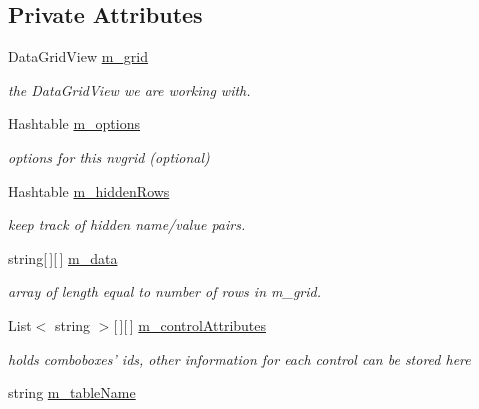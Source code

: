 \subsection*{Private Attributes}
\begin{DoxyCompactItemize}
\item 
DataGridView \hyperlink{class_ias_pbx_config_1_1_name_value_grid_a588270d544b904d41de5081329739d3d}{m\_\-grid}
\begin{DoxyCompactList}\small\item\em the DataGridView we are working with. \item\end{DoxyCompactList}\item 
Hashtable \hyperlink{class_ias_pbx_config_1_1_name_value_grid_a536cacb74f82c03d40dee9f8cf4b0da5}{m\_\-options}
\begin{DoxyCompactList}\small\item\em options for this nvgrid (optional) \item\end{DoxyCompactList}\item 
Hashtable \hyperlink{class_ias_pbx_config_1_1_name_value_grid_aba9a53f0a732686cb3ba46dce7171a75}{m\_\-hiddenRows}
\begin{DoxyCompactList}\small\item\em keep track of hidden name/value pairs. \item\end{DoxyCompactList}\item 
string\mbox{[}$\,$\mbox{]}\mbox{[}$\,$\mbox{]} \hyperlink{class_ias_pbx_config_1_1_name_value_grid_a816a0c9ece3edb83afb39863e1f843b4}{m\_\-data}
\begin{DoxyCompactList}\small\item\em array of length equal to number of rows in m\_\-grid. \item\end{DoxyCompactList}\item 
List$<$ string $>$\mbox{[}$\,$\mbox{]}\mbox{[}$\,$\mbox{]} \hyperlink{class_ias_pbx_config_1_1_name_value_grid_a57457b107cbaf9464e578effb30a7b5c}{m\_\-controlAttributes}
\begin{DoxyCompactList}\small\item\em holds comboboxes' ids, other information for each control can be stored here \item\end{DoxyCompactList}\item 
string \hyperlink{class_ias_pbx_config_1_1_name_value_grid_af6e6d9e0a9f40dd4e3e8d332e1f3018f}{m\_\-tableName}

\end{DoxyCompactItemize}
